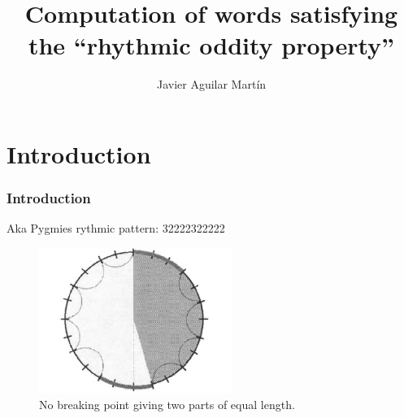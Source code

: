\documentclass{beamer}
\title{Computation of words satisfying the “rhythmic oddity property”}
\author{Javier Aguilar Martín}
\institute{Universidad de Sevilla}
\date{}
\theoremstyle{definition}
\begin{document}
\frame{\titlepage}
%
%
% 
% 
% 
% 



\newcommand{\seti}{\setcounter{saveenumi}{\value{enumi}}}
\newcommand{\conti}{\setcounter{enumi}{\value{saveenumi}}}



\section{Introduction}

\begin{frame}
\frametitle{Introduction}
Aka Pygmies rythmic pattern: 32222322222
\begin{figure}[h!]
\includegraphics[scale=0.7 ]{circulo}
\caption{No breaking point giving two parts of equal length.}
\end{figure}
\end{frame}

\end{document}
